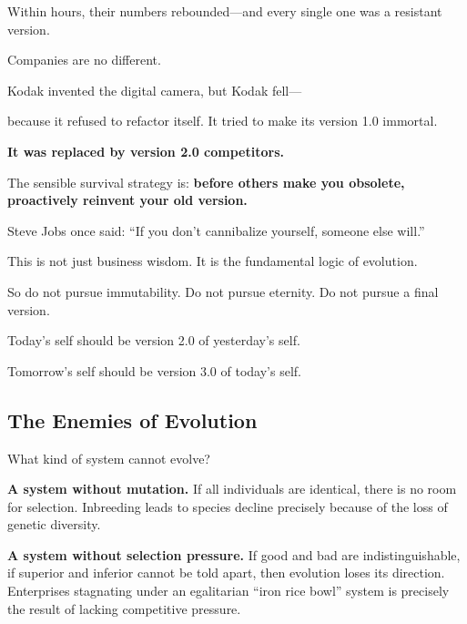 Within hours, their numbers rebounded---and every single one was a resistant version.

\vspace{1em}

Companies are no different.

Kodak invented the digital camera, but Kodak fell---

because it refused to refactor itself. It tried to make its version 1.0 immortal.

\textbf{It was replaced by version 2.0 competitors.}

The sensible survival strategy is: \textbf{before others make you obsolete, proactively reinvent your old version.}

Steve Jobs once said: ``If you don't cannibalize yourself, someone else will.''

This is not just business wisdom. It is the fundamental logic of evolution.

\vspace{1em}

So do not pursue immutability. Do not pursue eternity. Do not pursue a final version.

Today's self should be version 2.0 of yesterday's self.

Tomorrow's self should be version 3.0 of today's self.





\subsection{The Enemies of Evolution}

What kind of system cannot evolve?

\textbf{A system without mutation.} If all individuals are identical, there is no room for selection. Inbreeding leads to species decline precisely because of the loss of genetic diversity.

\textbf{A system without selection pressure.} If good and bad are indistinguishable, if superior and inferior cannot be told apart, then evolution loses its direction. Enterprises stagnating under an egalitarian ``iron rice bowl'' system is precisely the result of lacking competitive pressure.

